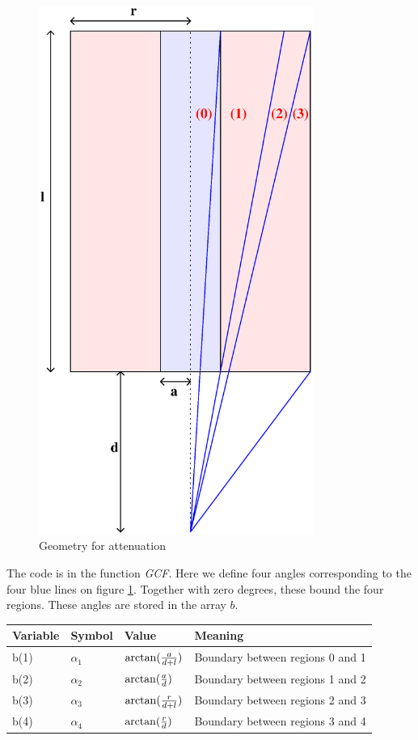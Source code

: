 \begin{figure}[ht!]
\includegraphics[width=0.8\textwidth]{geometry_for_attenuation.ps}
\caption{Geometry for attenuation}
\label{fig:atten}
\end{figure}

\noindent The code is in the function {\em GCF}. Here we define four
angles corresponding to the four blue lines on figure \ref{fig:atten}.
Together with zero degrees, these bound the four regions. These angles
are stored in the array $b$.

\begin{center}
\begin{tabular}{|llll|}
\hline
Variable & Symbol & Value & Meaning\\
\hline
b(1) & $\alpha_1$ & $\arctan({a \over d + l})$ & Boundary between regions 0 and 1\\
b(2) & $\alpha_2$ & $\arctan({a \over d})$ & Boundary between regions 1 and 2\\
b(3) & $\alpha_3$ & $\arctan({r \over d + l})$ & Boundary between regions 2 and 3\\
b(4) & $\alpha_4$ & $\arctan({r \over d})$ & Boundary between regions 3 and 4\\
\hline
\end{tabular}
\end{center}

